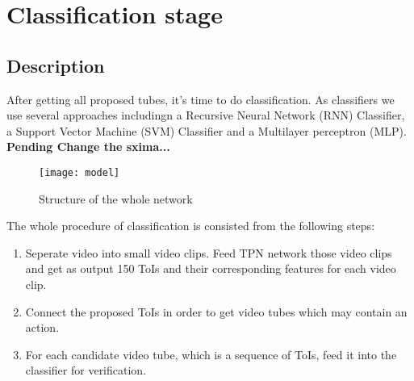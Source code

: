 



% 

\chapter{Classification stage}
\section{Description}
After getting all proposed tubes, it's time to do classification. As classifiers we use several approaches includingn
a Recursive Neural Network (RNN) Classifier, a Support Vector Machine (SVM) Classifier and a Multilayer perceptron (MLP).
\textbf{Pending Change the sxima...}
\\
\begin{figure}[h]
  \centering
  \texttt{[image: model]}
  \caption{Structure of the whole network}
  \label{fig:whole_network}
\end{figure}

The whole procedure of classification is consisted from the following steps:
\begin{enumerate}
\item Seperate video into small video clips. Feed TPN network those video clips and get as output
  150 ToIs and their corresponding features for each video clip.
\item Connect the proposed ToIs in order to get video tubes which may contain an action.
\item For each candidate video tube, which is a sequence of ToIs, feed it into the classifier
  for verification.
\end{enumerate}

